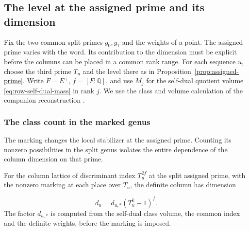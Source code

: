 \subsection{The level at the assigned prime and its dimension}\label{subsec:selected-word-level}
\hypertarget{source-selected-word-level}{}

Fix the two common split primes \(g_0,g_1\) and the weights of a point. The assigned prime varies with the word. Its contribution to the dimension must be explicit before the columns can be placed in a common rank range. For each sequence \(u\), choose the third prime \(T_u\) and the level there as in Proposition~\ref{prop:assigned-prime}. Write \(F=E^+\), \(f=[F:\mathbb Q]\), and use \(M_j\)
for the self-dual quotient volume \eqref{eq:row-self-dual-mass} in
rank \(j\). We use the class and volume calculation of the companion
reconstruction \cite{companion-word-rank}.

\subsubsection{The class count in the marked genus}

The marking changes the local stabilizer at the assigned prime. Counting its nonzero possibilities in the split genus isolates the entire dependence of the column dimension on that prime.

\begin{proposition}\label{prop:marked-column-dimension}
For the column lattice of discriminant index \(T_u^{2f}\) at the
split assigned prime, with the nonzero marking at each place over
\(T_u\), the definite column has dimension

\[
 d_u=d_{u,*}(T_u^k-1)^f.
\]
 The factor \(d_{u,*}\) is computed
from the self-dual class volume, the common index and the
definite weights, before the marking is imposed.
\end{proposition}

